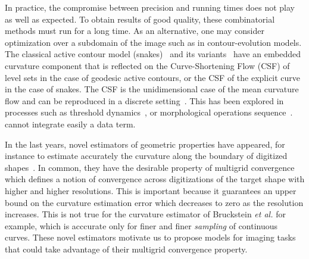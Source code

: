 \documentclass[review]{siamart220329}
\begin{document}
In practice, the compromise between precision and running times does not play as
well as expected. To obtain results of good quality, these combinatorial methods
must run for a long time. As an alternative, one may consider optimization over
a subdomain of the image such as in contour-evolution models. The classical
active contour model (snakes)~\cite{kass1988snakes} and its
variants~\cite{caseles97geodesic,chan01} have an embedded curvature component
that is reflected on the Curve-Shortening Flow (CSF) of level sets in the case
of geodesic active contours, or the CSF of the explicit curve in the case of
snakes. The CSF is the unidimensional case of the mean curvature flow and can be
reproduced in a discrete setting~\cite{merriman1992diffusion}. This has been
explored in processes such as threshold
dynamics~\cite{esedoglu2005threshold,esedoglu2008threshold}, or morphological
operations sequence~\cite{marquezneila14}.  cannot integrate
easily a data term. 

In the last years, novel estimators of geometric properties have appeared, for
instance to estimate accurately the curvature along the boundary of digitized
shapes~\cite{roussillon11mdca,schindele17mdca,coeurjolly13integral,coeurjolly12multigrid}.
In common, they have the desirable property of multigrid convergence which
defines a notion of convergence across digitizations of the target shape with
higher and higher resolutions. This is important because it guarantees an upper
bound on the curvature estimation error which decreases to zero as the
resolution increases. This is not true for the curvature estimator of Bruckstein
{\em et al.} \cite{bruckstein01convergence} for example, which is acccurate only
for finer and finer {\em sampling} of continuous curves. These novel estimators
motivate us to propose models for imaging tasks that could take advantage of
their multigrid convergence property.
%
%
%
%
\end{document}
